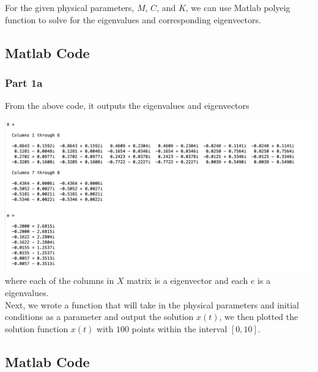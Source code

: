 \documentclass[10pt,a4paper]{article}
\begin{document}
For the given physical parameters, $M$, $C$, and $K$, we can use Matlab polyeig function to solve for the eigenvalues and corresponding eigenvectors. 

\subsection*{Matlab Code}

\subsubsection{Part 1a}


From the above code, it outputs the eigenvalues and eigenvectors

\includegraphics[scale = 0.50]{figures/Part1aOut.png}
where each of the columns in $X$ matrix is a eigenvector and each $e$ is a eigenvalues.
\\
Next, we wrote a function that will take in the physical parameters and initial conditions as a parameter and output the solution $x(t)$, we then plotted the solution function $x(t)$ with $100$ points within the interval $[0,10]$.
\subsection*{Matlab Code}
\end{document}
